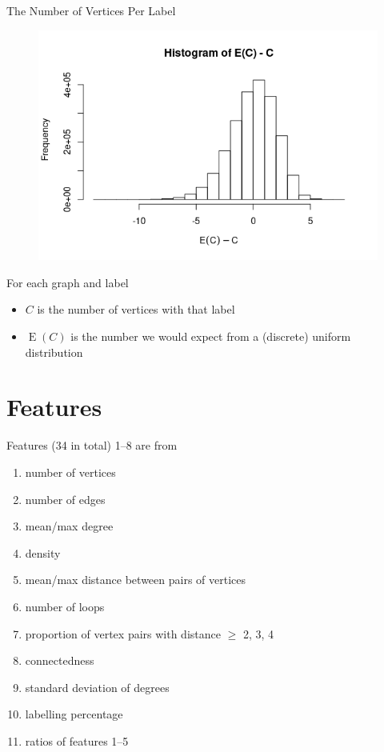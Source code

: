 \documentclass{beamer}
\DeclareMathOperator{\E}{E}
\begin{document}
\begin{frame}{The Number of Vertices Per Label}
  \begin{figure}
    \centering
    \includegraphics[scale=0.4]{../dissertation/images/labelling_histogram.png}
  \end{figure}
  For each graph and label
  \begin{itemize}
  \item $C$ is the number of vertices with that label
  \item $\E(C)$ is the number we would expect from a (discrete) uniform distribution
  \end{itemize}
\end{frame}

\section{Features}
\begin{frame}{Features (34 in total)}
  1--8 are from \cite{DBLP:conf/lion/KotthoffMS16}
  \begin{enumerate}
  \item number of vertices
  \item number of edges
  \item mean/max degree
  \item density
  \item mean/max distance between pairs of vertices
  \item number of loops
  \item proportion of vertex pairs with distance $\ge$ 2, 3, 4
  \item connectedness
    \pause
  \item standard deviation of degrees
  \item labelling percentage
    \pause
  \item ratios of features 1--5
  \end{enumerate}
\end{frame}
\end{document}
